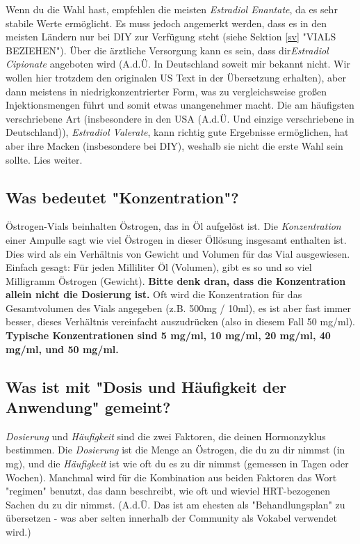 \documentclass{article}
\begin{document}
Wenn du die Wahl hast, empfehlen die meisten \textit{Estradiol Enantate}, da es sehr stabile Werte ermöglicht. Es muss jedoch angemerkt werden, dass es in den meisten Ländern nur bei DIY zur Verfügung steht (siehe Sektion \ref{sv} "VIALS BEZIEHEN"). Über die ärztliche Versorgung kann es sein, dass dir\textit{Estradiol Cipionate} angeboten wird (A.d.Ü. In Deutschland soweit mir bekannt nicht. Wir wollen hier trotzdem den originalen US Text in der Übersetzung erhalten), aber dann meistens in niedrigkonzentrierter Form, was zu vergleichsweise großen Injektionsmengen führt und somit etwas unangenehmer macht. Die am häufigsten verschriebene Art (insbesondere in den USA (A.d.Ü. Und einzige verschriebene in Deutschland)), \textit{Estradiol Valerate}, kann richtig gute Ergebnisse ermöglichen, hat aber ihre Macken (insbesondere bei DIY), weshalb sie nicht die erste Wahl sein sollte. Lies weiter.

\subsection{Was bedeutet "Konzentration"?}

Östrogen-Vials beinhalten Östrogen, das in Öl aufgelöst ist. Die \textit{Konzentration} einer Ampulle sagt wie viel Östrogen in dieser Öllösung insgesamt enthalten ist. Dies wird als ein Verhältnis von Gewicht und Volumen für das Vial ausgewiesen. Einfach gesagt: Für jeden Milliliter Öl (Volumen), gibt es so und so viel Milligramm Östrogen (Gewicht). \textbf{Bitte denk dran, dass die Konzentration allein nicht die Dosierung ist.} Oft wird die Konzentration für das Gesamtvolumen des Vials angegeben (z.B. 500mg / 10ml), es ist aber fast immer besser, dieses Verhältnis vereinfacht auszudrücken (also in diesem Fall 50 mg/ml). \textbf{Typische Konzentrationen sind 5 mg/ml, 10 mg/ml, 20 mg/ml, 40 mg/ml, und 50 mg/ml.}

\subsection{Was ist mit "Dosis und Häufigkeit der Anwendung" gemeint?}

\textit{Dosierung} und \textit{Häufigkeit} sind die zwei Faktoren, die deinen Hormonzyklus bestimmen. Die \textit{Dosierung} ist die Menge an Östrogen, die du zu dir nimmst (in mg), und die \textit{Häufigkeit} ist wie oft du es zu dir nimmst (gemessen in Tagen oder Wochen). Manchmal wird für die Kombination aus beiden Faktoren das Wort "regimen" benutzt, das dann beschreibt, wie oft und wieviel HRT-bezogenen Sachen du zu dir nimmst. (A.d.Ü.
 Das ist am ehesten als "Behandlungsplan" zu übersetzen - was aber selten innerhalb der Community als Vokabel verwendet wird.)
\end{document}
